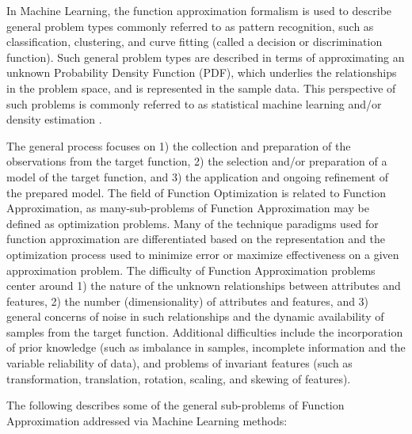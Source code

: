 \documentclass[a4paper, 11pt]{article}
\begin{document}
In Machine Learning, the function approximation formalism is used to describe general problem types commonly referred to as pattern recognition, such as classification, clustering, and curve fitting (called a decision or discrimination function). Such general problem types are described in terms of approximating an unknown Probability Density Function (PDF), which underlies the relationships in the problem space, and is represented in the sample data. This perspective of such problems is commonly referred to as statistical machine learning and/or density estimation \cite{Fukunaga1990, Bishop1995}.

The general process focuses on 1) the collection and preparation of the observations from the target function, 2) the selection and/or preparation of a model of the target function, and 3) the application and ongoing refinement of the prepared model. 
The field of Function Optimization is related to Function Approximation, as many-sub-problems of Function Approximation may be defined as optimization problems. Many of the technique paradigms used for function approximation are differentiated based on the representation and the optimization process used to minimize error or maximize effectiveness on a given approximation problem. 
The difficulty of Function Approximation problems center around 1) the nature of the unknown relationships between attributes and features, 2) the number (dimensionality) of attributes and features, and 3) general concerns of noise in such relationships and the dynamic availability of samples from the target function.
Additional difficulties include the incorporation of prior knowledge (such as imbalance in samples, incomplete information and the variable reliability of data), and problems of invariant features (such as transformation, translation, rotation, scaling, and skewing of features).

The following describes some of the general sub-problems of Function Approximation addressed via Machine Learning methods:
\end{document}
